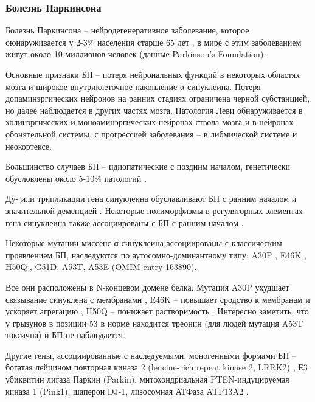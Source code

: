 \subsubsection{Болезнь Паркинсона}
Болезнь Паркинсона -- нейродегенеративное заболевание, которое оюнаруживается у 2-3\% населения старше 65 лет \cite{poewe_parkinson_2017}, в мире с этим заболеванием живут около 10 миллионов человек (данные Parkinson’s Foundation). 

Основные признаки БП -- потеря нейрональных функций в некоторых областях мозга и широкое внутриклеточное накопление α-синуклеина. Потеря допаминэргических нейронов на ранних стадиях ограничена черной субстанцией, но далее наблюдается в других частях мозга. 
Патология Леви обнаруживается в холинэргических и моноаминэргических нейронах ствола мозга и в нейронах обонятельной системы, с прогрессией заболевания -- в либмической системе и неокортексе.

Большинство случаев БП -- идиопатические с поздним началом, генетически обусловлены около 5-10\% патологий \cite{klein_genetics_2012}. 

Ду- или трипликации гена синуклеина обуславливают БП с ранним началом  и значительной деменцией \cite{chartier-harlin_alpha-synuclein_2004, ahn_-synuclein_2008, singleton_-synuclein_2003}. Некоторые полиморфизмы в регуляторных элементах гена синуклеина также ассоциированы с БП с ранним началом \cite{maraganore_collaborative_2006}.

Некоторые мутации миссенс α-синуклеина ассоциированы с классическим проявлением БП, наследуются по аутосомно-доминантному типу: A30P \cite{kruger_ala30pro_1998}, E46K \cite{zarranz_new_2004}, H50Q \cite{appel-cresswell_alpha-synuclein_2013}, G51D\cite{lesage_g51d_2013}, A53T\cite{puschmann_swedish_2009}, A53E \cite{pasanen_novel_2014} (OMIM entry 163890).

 Все они расположены в N-концевом домене белка. Мутация A30P ухудшает связывание синуклена с мембранами \cite{jo_defective_2002}, E46K -- повышает сродство к мембранам и ускоряет агрегацию \cite{choi_mutation_2004}, H50Q -- понижает растворимость \cite{porcari_h50q_2015}. Интересно заметить, что у грызунов в позиции 53 в норме находится треонин (для людей мутация A53T токсична) и БП не наблюдается.
 
 
Другие гены, ассоциированные с наследуемыми, моногенными формами БП -- богатая лейцином повторная киназа 2 (leucine-rich repeat kinase 2, LRRK2) , Е3 убиквитин лигаза Паркин (Parkin), митохондриальная PTEN-индуцируемая киназа 1 (Pink1), шаперон DJ-1, лизосомная АТФаза ATP13A2 \cite{klein_genetics_2012}.


